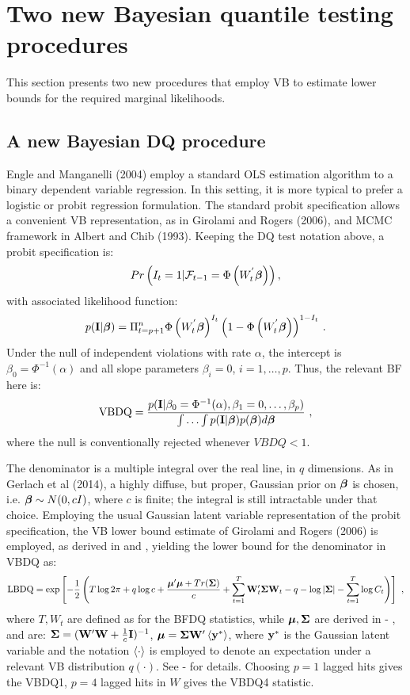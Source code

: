 \documentclass[12pt,epsf]{article}
\newcommand{\utwi}[1]{\mbox{\boldmath $ #1$}}
\newcommand{\calF}{{\cal F}}
\begin{document}
\section{Two new Bayesian quantile testing procedures}
This section presents two new procedures that employ VB to estimate lower bounds for the required marginal likelihoods.

\subsection{A new Bayesian DQ procedure}
Engle and Manganelli (2004) employ a standard OLS estimation algorithm to a binary dependent variable regression. In this setting, it is
more typical to prefer a logistic or probit regression formulation. The standard probit specification allows a
convenient VB representation, as in Girolami and Rogers (2006), and MCMC framework in Albert and Chib (1993).
Keeping the DQ test notation above, a probit specification is:
$$ Pr\clrbracket{I_t=1 | \calF_{t-1} = \Phi \left(W_t^{'}\utwi{\beta}\right)},$$
with associated likelihood function:
$$
p({\bf I}|\utwi{\beta}) = \Pi_{t=p+1}^{n} \Phi\left(W_t^{'}\utwi{\beta} \right)^{I_t}
\left(1-\Phi\left(W_t^{'}\utwi{\beta} \right)\right)^{1-I_t} \,.
$$
Under the null of independent violations with rate $\alpha$, the intercept is
$\beta_0 = \Phi^{-1}(\alpha)$ and all slope parameters $\beta_i = 0$, $i=1,\ldots,p$. Thus,
the relevant BF here is:
\begin{eqnarray*}
\mbox{VBDQ} = \frac{ p({\bf I} | \beta_0 = \Phi^{-1}(\alpha), \beta_1=0,\ldots,\beta_p)}
              { \int \ldots \int p({\bf I}|\utwi{\beta}) p(\utwi{\beta}) d \utwi{\beta} } \,\, ,
\end{eqnarray*}
where the null is conventionally rejected whenever $VBDQ<1$.

The denominator is a multiple integral over the real line, in $q$ dimensions. As in Gerlach et al (2014), a highly diffuse, but proper,
Gaussian prior on $\utwi{\beta}$ is chosen, i.e. $\utwi{\beta} \sim N(0,cI)$, where $c$ is finite; the
integral is still intractable under that choice. Employing the usual Gaussian latent variable representation of the probit specification,
the VB lower bound estimate of Girolami and Rogers (2006) is employed, as derived in  and ,
yielding the lower bound for the denominator in VBDQ as:
\begin{align}
\mbox{LBDQ} = \exp \left[-\frac{1}{2}\left(T\log 2\pi+q\log c+\frac{{\boldsymbol{\mu}}'{\boldsymbol{\mu}}+Tr({\mathbf{\Sigma}})}{c}+
\sum_{t=1}^{T}\mathbf{W}_t'{\mathbf{\Sigma}}\mathbf{W}_t-q-\log|{\mathbf{\Sigma}}|-\sum_{t=1}^{T}\log C_t\right) \right] \,\, ,
\end{align}
where $T, W_t$ are defined as for the BFDQ statistics, while ${\boldsymbol{\mu}}, {\mathbf{\Sigma}}$ are derived in  - ,
and are: ${\mathbf{\Sigma}}= (\mathbf{W}'\mathbf{W}+\frac{1}{c}\mathbf{I})^{-1}$, ${\boldsymbol{\mu}} ={\mathbf{\Sigma}}\mathbf{W}'\left\langle\mathbf{y}^*\right\rangle$, where $\mathbf{y}^*$ is the Gaussian latent variable
and the notation $\left\langle\cdot\right\rangle$ is employed to denote an expectation under a relevant VB distribution $q(\cdot)$.
See  -  for details. Choosing $p=1$ lagged hits gives the VBDQ1, $p=4$ lagged hits in $W$ gives the
VBDQ4 statistic.
\end{document}
